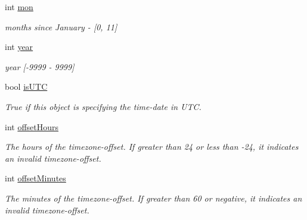 \begin{DoxyCompactItemize}
int \hyperlink{structlib_c_z_i_1_1_xml_date_time_aa6dedc3005bf4d2fec428e8d3e27460c}{mon}
\begin{DoxyCompactList}\small\item\em months since January -\/ \mbox{[}0, 11\mbox{]} \end{DoxyCompactList}\item 
\mbox{\label{structlib_c_z_i_1_1_xml_date_time_a28b0ef778b554d027dd79704fb4f8565}} 
int \hyperlink{structlib_c_z_i_1_1_xml_date_time_a28b0ef778b554d027dd79704fb4f8565}{year}
\begin{DoxyCompactList}\small\item\em year \mbox{[}-\/9999 -\/ 9999\mbox{]} \end{DoxyCompactList}\item 
\mbox{\label{structlib_c_z_i_1_1_xml_date_time_a24fb6d660a4404438bc1e38f39d7ca92}} 
bool \hyperlink{structlib_c_z_i_1_1_xml_date_time_a24fb6d660a4404438bc1e38f39d7ca92}{is\+U\+TC}
\begin{DoxyCompactList}\small\item\em True if this object is specifying the time-\/date in U\+TC. \end{DoxyCompactList}\item 
\mbox{\label{structlib_c_z_i_1_1_xml_date_time_a9d3a3eb23c3ed6efe0b1ef51afc3460d}} 
int \hyperlink{structlib_c_z_i_1_1_xml_date_time_a9d3a3eb23c3ed6efe0b1ef51afc3460d}{offset\+Hours}
\begin{DoxyCompactList}\small\item\em The hours of the timezone-\/offset. If greater than 24 or less than -\/24, it indicates an invalid timezone-\/offset. \end{DoxyCompactList}\item 
\mbox{\label{structlib_c_z_i_1_1_xml_date_time_a3d565525946ec7c7e631dee5db70e50f}} 
int \hyperlink{structlib_c_z_i_1_1_xml_date_time_a3d565525946ec7c7e631dee5db70e50f}{offset\+Minutes}
\begin{DoxyCompactList}\small\item\em The minutes of the timezone-\/offset. If greater than 60 or negative, it indicates an invalid timezone-\/offset. \end{DoxyCompactList}\end{DoxyCompactItemize}


